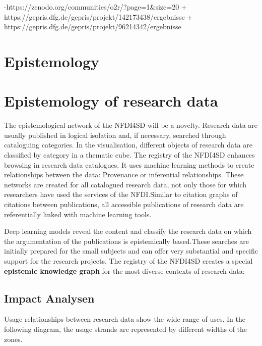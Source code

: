 \documentclass[
  english,
  paper=a4,
  oneside,captions=tableheading
]{scrbook}
\begin{document}
-https://zenodo.org/communities/o2r/?page=1\&size=20 +
https://gepris.dfg.de/gepris/projekt/142173438/ergebnisse +
https://gepris.dfg.de/gepris/projekt/96214342/ergebnisse

\hypertarget{epistemology}{%
\section{Epistemology}\label{epistemology}}

\hypertarget{epistemology-of-research-data-1}{%
\section{Epistemology of research
data}\label{epistemology-of-research-data-1}}

\hypertarget{observablehq-20a6021f}{}

The epistemological network of the NFDI4SD will be a novelty. Research
data are usually published in logical isolation and, if necessary,
searched through cataloguing categories. In the visualisation, different
objects of research data are classified by category in a thematic cube.
The registry of the NFDI4SD enhances browsing in research data
catalogues. It uses machine learning methods to create relationships
between the data: Provenance or inferential relationships. These
networks are created for all catalogued research data, not only those
for which researchers have used the services of the NFDI.Similar to
citation graphs of citations between publications, all accessible
publications of research data are referentially linked with machine
learning tools.

Deep learning models reveal the content and classify the research data
on which the argumentation of the publications is epistemically
based.These searches are initially prepared for the small subjects and
can offer very substantial and specific support for the research
projects. The registry of the NFDI4SD creates a special
\textbf{epistemic knowledge graph} for the most diverse contexts of
research data:

\hypertarget{impact-analysen}{%
\subsection{Impact Analysen}\label{impact-analysen}}

Usage relationships between research data show the wide range of uses.
In the following diagram, the usage strands are represented by different
widths of the zones.
\end{document}
